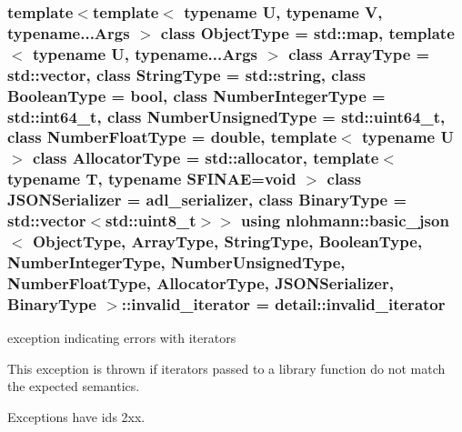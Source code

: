 \subsubsection[{\texorpdfstring{invalid\+\_\+iterator}{invalid_iterator}}]{\setlength{\rightskip}{0pt plus 5cm}template$<$template$<$ typename U, typename V, typename...\+Args $>$ class Object\+Type = std\+::map, template$<$ typename U, typename...\+Args $>$ class Array\+Type = std\+::vector, class String\+Type  = std\+::string, class Boolean\+Type  = bool, class Number\+Integer\+Type  = std\+::int64\+\_\+t, class Number\+Unsigned\+Type  = std\+::uint64\+\_\+t, class Number\+Float\+Type  = double, template$<$ typename U $>$ class Allocator\+Type = std\+::allocator, template$<$ typename T, typename S\+F\+I\+N\+A\+E=void $>$ class J\+S\+O\+N\+Serializer = adl\+\_\+serializer, class Binary\+Type  = std\+::vector$<$std\+::uint8\+\_\+t$>$$>$ using {\bf nlohmann\+::basic\+\_\+json}$<$ Object\+Type, Array\+Type, String\+Type, Boolean\+Type, Number\+Integer\+Type, Number\+Unsigned\+Type, Number\+Float\+Type, Allocator\+Type, J\+S\+O\+N\+Serializer, Binary\+Type $>$\+::{\bf invalid\+\_\+iterator} =  {\bf detail\+::invalid\+\_\+iterator}}\hypertarget{classnlohmann_1_1basic__json_a6ccc9788413fd58de998fe92743cb4aa}{}\label{classnlohmann_1_1basic__json_a6ccc9788413fd58de998fe92743cb4aa}


exception indicating errors with iterators 

This exception is thrown if iterators passed to a library function do not match the expected semantics.

Exceptions have ids 2xx.

